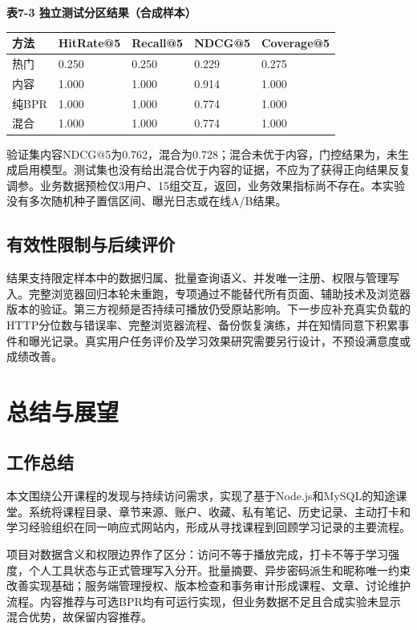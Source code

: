 \documentclass[UTF8,12pt,a4paper,oneside,openany]{ctexbook}
\begin{document}
\noindent\textbf{表7-3 独立测试分区结果（合成样本）}

{\small
\begin{longtable}{P{0.176\textwidth}P{0.176\textwidth}P{0.176\textwidth}P{0.176\textwidth}P{0.176\textwidth}}
\toprule
方法 & HitRate@5 & Recall@5 & NDCG@5 & Coverage@5 \\
\midrule
\endhead
热门 & 0.250 & 0.250 & 0.229 & 0.275 \\
内容 & 1.000 & 1.000 & 0.914 & 1.000 \\
纯BPR & 1.000 & 1.000 & 0.774 & 1.000 \\
混合 & 1.000 & 1.000 & 0.774 & 1.000 \\
\bottomrule
\end{longtable}}

验证集内容NDCG@5为0.762，混合为0.728；混合未优于内容，门控结果为，未生成启用模型。测试集也没有给出混合优于内容的证据，不应为了获得正向结果反复调参。业务数据预检仅3用户、15组交互，返回，业务效果指标尚不存在。本实验没有多次随机种子置信区间、曝光日志或在线A/B结果。


\section{有效性限制与后续评价}

结果支持限定样本中的数据归属、批量查询语义、并发唯一注册、权限与管理写入。完整浏览器回归本轮未重跑，专项通过不能替代所有页面、辅助技术及浏览器版本的验证。第三方视频是否持续可播放仍受原站影响。下一步应补充真实负载的HTTP分位数与错误率、完整浏览器流程、备份恢复演练，并在知情同意下积累事件和曝光记录。真实用户任务评价及学习效果研究需要另行设计，不预设满意度或成绩改善。


\chapter{总结与展望}

\section{工作总结}

本文围绕公开课程的发现与持续访问需求，实现了基于Node.js和MySQL的知途课堂。系统将课程目录、章节来源、账户、收藏、私有笔记、历史记录、主动打卡和学习经验组织在同一响应式网站内，形成从寻找课程到回顾学习记录的主要流程。


项目对数据含义和权限边界作了区分：访问不等于播放完成，打卡不等于学习强度，个人工具状态与正式管理写入分开。批量摘要、异步密码派生和昵称唯一约束改善实现基础；服务端管理授权、版本检查和事务审计形成课程、文章、讨论维护流程。内容推荐与可选BPR均有可运行实现，但业务数据不足且合成实验未显示混合优势，故保留内容推荐。
\end{document}
